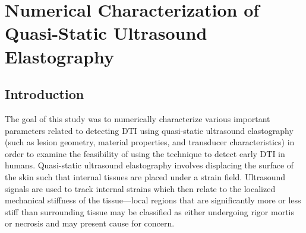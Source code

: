 \chapter{Numerical Characterization of Quasi-Static Ultrasound Elastography}
	\label{chap:quasi-static}
	\section{Introduction}
		The goal of this study was to numerically characterize various important parameters related to detecting DTI using quasi-static ultrasound elastography (such as lesion geometry, material properties, and transducer characteristics) in order to examine the feasibility of using the technique to detect early DTI in humans. Quasi-static ultrasound elastography involves displacing the surface of the skin such that internal tissues are placed under a strain field. Ultrasound signals are used to track internal strains which then relate to the localized mechanical stiffness of the tissue---local regions that are significantly more or less stiff than surrounding tissue may be classified as either undergoing rigor mortis or necrosis and may present cause for concern.
		
